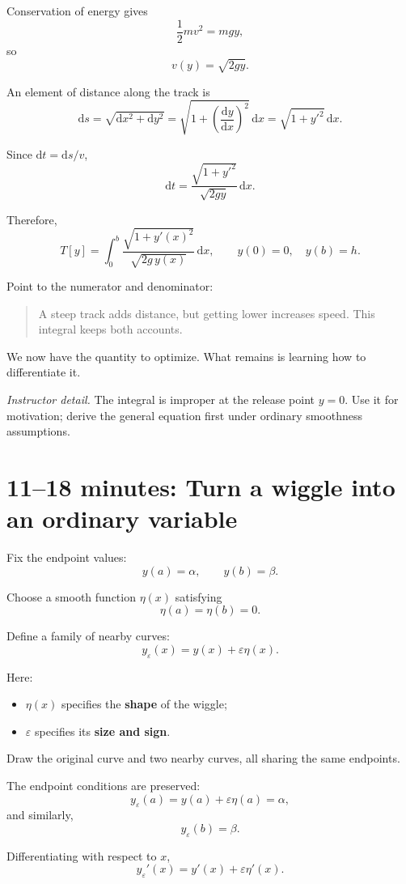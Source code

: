 \documentclass[11pt,a4paper]{article}
\newcommand{\dd}{\mathrm{d}}
\begin{document}
Conservation of energy gives
\[
\frac12 mv^2=mgy,
\]
so
\[
v(y)=\sqrt{2gy}.
\]

An element of distance along the track is
\[
\dd s
=
\sqrt{\dd x^2+\dd y^2}
=
\sqrt{1+\left(\frac{\dd y}{\dd x}\right)^2}\,\dd x
=
\sqrt{1+y'^2}\,\dd x.
\]

Since \(\dd t=\dd s/v\),
\[
\dd t
=
\frac{\sqrt{1+y'^2}}{\sqrt{2gy}}\,\dd x.
\]

Therefore,
\[
\boxed{
T[y]
=
\int_0^b
\frac{\sqrt{1+y'(x)^2}}{\sqrt{2g\,y(x)}}\,\dd x,
\qquad
y(0)=0,\quad y(b)=h.
}
\]

Point to the numerator and denominator:
\begin{quote}
A steep track adds distance, but getting lower increases speed.
This integral keeps both accounts.
\end{quote}

We now have the quantity to optimize.
What remains is learning how to differentiate it.

\textit{Instructor detail.}
The integral is improper at the release point \(y=0\).
Use it for motivation; derive the general equation first under
ordinary smoothness assumptions.

\section*{11--18 minutes: Turn a wiggle into an ordinary variable}

Fix the endpoint values:
\[
y(a)=\alpha,
\qquad
y(b)=\beta.
\]

Choose a smooth function \(\eta(x)\) satisfying
\[
\eta(a)=\eta(b)=0.
\]

Define a family of nearby curves:
\[
\boxed{
y_\varepsilon(x)=y(x)+\varepsilon\eta(x).
}
\]

Here:
\begin{itemize}
\item \(\eta(x)\) specifies the \textbf{shape} of the wiggle;
\item \(\varepsilon\) specifies its \textbf{size and sign}.
\end{itemize}

Draw the original curve and two nearby curves, all sharing the
same endpoints.

The endpoint conditions are preserved:
\[
y_\varepsilon(a)
=
y(a)+\varepsilon\eta(a)
=
\alpha,
\]
and similarly,
\[
y_\varepsilon(b)=\beta.
\]

Differentiating with respect to \(x\),
\[
y_\varepsilon'(x)
=
y'(x)+\varepsilon\eta'(x).
\]
\end{document}

